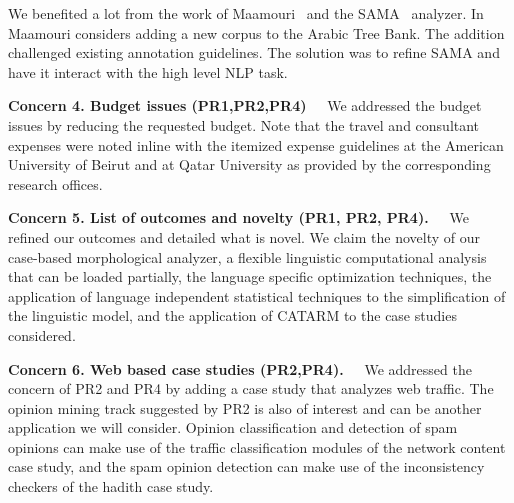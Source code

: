\documentclass[12pt]{article}
\begin{document}
We benefited a lot from the work of Maamouri~\cite{Maamouri:10}
and the SAMA~\cite{Kulick:10} analyzer. 
In~\cite{Maamouri:10} Maamouri considers adding a new corpus
to the Arabic Tree Bank. The addition challenged existing
annotation guidelines. 
The solution was to refine SAMA and have it interact with the
high level NLP task.



{\bf Concern 4. Budget issues (PR1,PR2,PR4)~~}
We addressed the budget issues by reducing the requested budget.
Note that the travel and consultant expenses were noted inline 
with the itemized expense guidelines at the American
University of Beirut and at Qatar University as provided
by the corresponding research offices. 

{\bf Concern 5. List of outcomes and novelty (PR1, PR2, PR4).~~}
We refined our outcomes and detailed what is novel. 
We claim the novelty of our case-based morphological analyzer, 
a flexible linguistic computational analysis that can be loaded 
partially, the language specific optimization techniques, 
the application of language independent statistical techniques
to the simplification of the linguistic model, and the 
application of CATARM to the case studies considered. 

{\bf Concern 6. Web based case studies (PR2,PR4).~~}
We addressed the concern of PR2 and PR4 by adding a case study that 
analyzes web traffic. 
The opinion mining track suggested by PR2 is also of interest and 
can be another application we will consider.
Opinion classification and detection of spam opinions
can make use of the traffic classification modules of the network
content case study, and the spam opinion detection can 
make use of the inconsistency checkers of the hadith case study.
\end{document}
